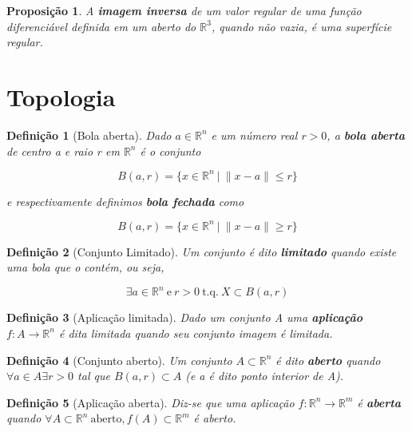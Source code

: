 \documentclass[12pt]{article}
\newtheorem{prop}{Proposição}
\newtheorem{ex}{Exemplo}[section]
\newtheorem{definition}{Definição}
\begin{document}
\begin{prop}
A \textbf{imagem inversa} de um valor regular de uma função diferenciável definida em um aberto do $\mathbb{R}^3$, quando não vazia, é uma superfície regular.
\end{prop}



\section*{Topologia}
\begin{definition}[Bola aberta]
Dado $a \in \mathbb{R}^n$ e um número real $r > 0$, a \textbf{bola aberta} de centro a e raio r em $\mathbb{R}^n$ é o conjunto

$$B(a, r) = \{ x \in \mathbb{R}^n\ |\ \| x - a \| \leq r \}$$

e respectivamente definimos \textbf{bola fechada} como

$$B(a, r) = \{ x \in \mathbb{R}^n\ |\ \| x - a \| \geq r \}$$
\end{definition}

\begin{definition}[Conjunto Limitado]
Um conjunto é dito \textbf{limitado} quando existe uma bola que o contém, ou seja,

$$\exists a \in \mathbb{R}^n\ \mathrm{e}\ r>0\ \mathrm{t.q.}\ X \subset B(a, r)$$
\end{definition}

\begin{definition}[Aplicação limitada]
Dado um conjunto A uma \textbf{aplicação} $f: A \rightarrow \mathbb{R}^n$ é dita limitada quando seu conjunto imagem é limitada.
\end{definition}

\begin{definition}[Conjunto aberto]
Um conjunto $A \subset \mathbb{R}^n$ é dito \textbf{aberto} quando $\forall a \in A \exists r > 0$ tal que $B(a, r) \subset A$ (e a é dito ponto interior de A).
\end{definition}

\begin{definition}[Aplicação aberta]
Diz-se que uma aplicação $f: \mathbb{R}^n \rightarrow \mathbb{R}^m$ é \textbf{aberta} quando $\forall A \subset \mathbb{R}^n\ \mathrm{aberto}, f(A) \subset \mathbb{R}^m$ é aberto.
\end{definition}
\end{document}
